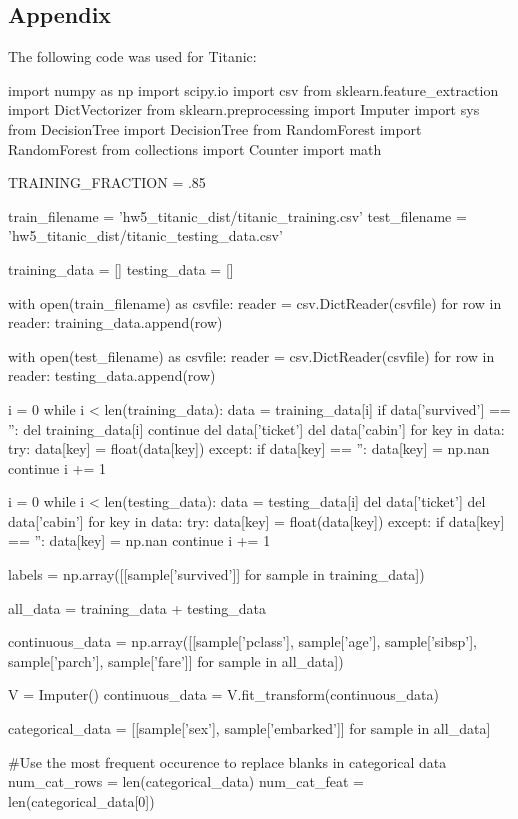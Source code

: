 \documentclass{article}
\begin{document}
\subsection*{Appendix}
The following code was used for Titanic:
\begin{python}
import numpy as np
import scipy.io
import csv
from sklearn.feature_extraction import DictVectorizer
from sklearn.preprocessing import Imputer
import sys
from DecisionTree import DecisionTree
from RandomForest import RandomForest
from collections import Counter
import math

TRAINING_FRACTION = .85

train_filename = 'hw5_titanic_dist/titanic_training.csv'
test_filename = 'hw5_titanic_dist/titanic_testing_data.csv'

training_data = []
testing_data = []

with open(train_filename) as csvfile:
    reader = csv.DictReader(csvfile)
    for row in reader:
        training_data.append(row)

with open(test_filename) as csvfile:
    reader = csv.DictReader(csvfile)
    for row in reader:
        testing_data.append(row)

i = 0
while i < len(training_data):
    data = training_data[i]
    if data['survived'] == '':
        del training_data[i]
        continue
    del data['ticket']
    del data['cabin']
    for key in data:
        try:
            data[key] = float(data[key])
        except:
            if data[key] == '':
                data[key] = np.nan
            continue
    i += 1

i = 0
while i < len(testing_data):
    data = testing_data[i]
    del data['ticket']
    del data['cabin']
    for key in data:
        try:
            data[key] = float(data[key])
        except:
            if data[key] == '':
                data[key] = np.nan
            continue
    i += 1

labels = np.array([[sample['survived']] for sample in training_data])

all_data = training_data + testing_data

continuous_data = np.array([[sample['pclass'], sample['age'],
    sample['sibsp'], sample['parch'], sample['fare']] for sample in all_data])

V = Imputer()
continuous_data = V.fit_transform(continuous_data)

categorical_data = [[sample['sex'], sample['embarked']] for sample in all_data]

#Use the most frequent occurence to replace blanks in categorical data
num_cat_rows = len(categorical_data)
num_cat_feat = len(categorical_data[0])


\end{python}
\end{document}
